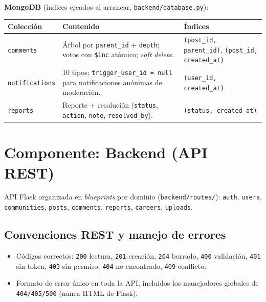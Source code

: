 \documentclass{article}
\begin{document}
\textbf{MongoDB} (índices creados al arrancar, \texttt{backend/database.py}):

\begin{table}[H]
\setlength{\tabcolsep}{0.4em}
{\renewcommand{\arraystretch}{1.25}
\begin{tabular}{|p{3.4cm}|p{7.2cm}|p{3.8cm}|}
    \hline
    \rowcolor{tablebackground}
    \color{white}\textbf{Colección} & \color{white}\textbf{Contenido} & \color{white}\textbf{Índices} \\
    \hline
    \texttt{comments} & Árbol por \texttt{parent\_id} + \texttt{depth}; votos con \texttt{\$inc} atómico; \textit{soft delete}. & \texttt{(post\_id, parent\_id)}, \texttt{(post\_id, created\_at)} \\
    \hline
    \texttt{notifications} & 10 tipos; \texttt{trigger\_user\_id = null} para notificaciones anónimas de moderación. & \texttt{(user\_id, created\_at)} \\
    \hline
    \texttt{reports} & Reporte + resolución (\texttt{status}, \texttt{action}, \texttt{note}, \texttt{resolved\_by}). & \texttt{(status, created\_at)} \\
    \hline
\end{tabular}}
\end{table}

\section{Componente: Backend (API REST)}

API Flask organizada en \textit{blueprints} por dominio
(\texttt{backend/routes/}): \texttt{auth}, \texttt{users},
\texttt{communities}, \texttt{posts}, \texttt{comments}, \texttt{reports},
\texttt{careers}, \texttt{uploads}.

\subsection{Convenciones REST y manejo de errores}

\begin{itemize}[itemsep=2pt]
    \item Códigos correctos: \texttt{200} lectura, \texttt{201} creación,
    \texttt{204} borrado, \texttt{400} validación, \texttt{401} sin token,
    \texttt{403} sin permiso, \texttt{404} no encontrado, \texttt{409} conflicto.
    \item Formato de error único en toda la API, incluidos los manejadores
    globales de \texttt{404/405/500} (nunca HTML de Flask):
\end{itemize}
\end{document}
